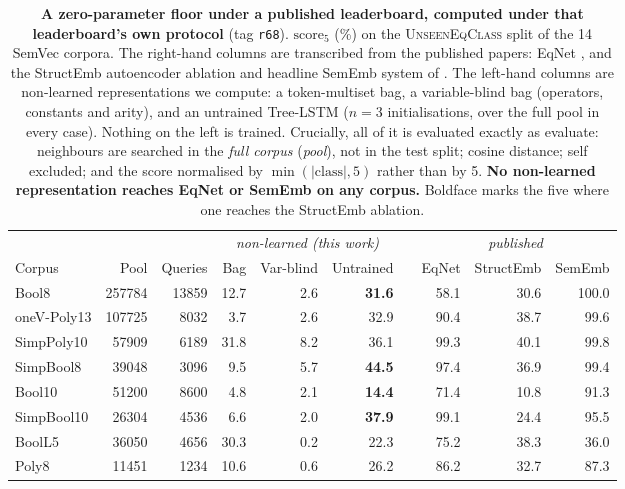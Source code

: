 \begin{table}[H]
\centering
\caption{\textbf{A zero-parameter floor under a published leaderboard, computed under that leaderboard's own protocol} (tag \texttt{r68}). $\mathrm{score}_5$ (\%) on the \textsc{UnseenEqClass} split of the 14 SemVec corpora. The right-hand columns are transcribed from the published papers: EqNet \citep{allamanis2017learning}, and the StructEmb autoencoder ablation and headline SemEmb system of \citet{gangwar2023semantic}. The left-hand columns are non-learned representations we compute: a token-multiset bag, a variable-blind bag (operators, constants and arity), and an untrained Tree-LSTM ($n{=}3$ initialisations, over the full pool in every case). Nothing on the left is trained. Crucially, all of it is evaluated exactly as \citet{allamanis2017learning} evaluate: neighbours are searched in the \emph{full corpus} (\emph{pool}), not in the test split; cosine distance; self excluded; and the score normalised by $\min(|\text{class}|, 5)$ rather than by 5. \textbf{No non-learned representation reaches EqNet or SemEmb on any corpus.} Boldface marks the five where one reaches the StructEmb ablation.}
\label{tab:score5}
\small
\setlength{\tabcolsep}{4pt}
\begin{tabular}{l r r rrr r rrr}
\toprule
& & & \multicolumn{3}{c}{\emph{non-learned (this work)}} & & \multicolumn{3}{c}{\emph{published}} \\
\cmidrule(lr){4-6} \cmidrule(lr){8-10}
Corpus & Pool & Queries & Bag & Var-blind & Untrained & & EqNet & StructEmb & SemEmb \\
\midrule
Bool8        & 257784 & 13859 & 12.7 &  2.6 & \textbf{31.6} & & 58.1 & 30.6 & 100.0 \\
oneV-Poly13  & 107725 &  8032 &  3.7 &  2.6 & 32.9 & & 90.4 & 38.7 &  99.6 \\
SimpPoly10   &  57909 &  6189 & 31.8 &  8.2 & 36.1 & & 99.3 & 40.1 &  99.8 \\
SimpBool8    &  39048 &  3096 &  9.5 &  5.7 & \textbf{44.5} & & 97.4 & 36.9 &  99.4 \\
Bool10       &  51200 &  8600 &  4.8 &  2.1 & \textbf{14.4} & & 71.4 & 10.8 &  91.3 \\
SimpBool10   &  26304 &  4536 &  6.6 &  2.0 & \textbf{37.9} & & 99.1 & 24.4 &  95.5 \\
BoolL5       &  36050 &  4656 & 30.3 &  0.2 & 22.3 & & 75.2 & 38.3 &  36.0 \\
Poly8        &  11451 &  1234 & 10.6 &  0.6 & 26.2 & & 86.2 & 32.7 &  87.3 \\

\end{tabular}
\end{table}
